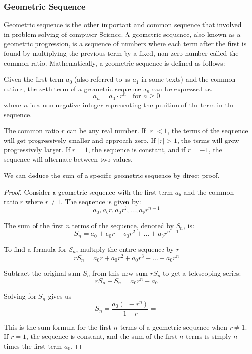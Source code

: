 \subsubsection{Geometric Sequence}
Geometric sequence is the other important and common sequence that involved in problem-solving of computer
Science. 
A geometric sequence, also known as a geometric progression, is a sequence of numbers where each term after 
the first is found by multiplying the previous term by a fixed, non-zero number called the common ratio. 
Mathematically, a geometric sequence is defined as follows:
\begin{definition}
    Given the first term \( a_0 \) (also referred to as \( a_1 \) in some texts) and the common ratio \( r \), the \( n \)-th term of a geometric sequence \( a_n \) can be expressed as:
\[
a_n = a_0 \cdot r^n \quad \text{for } n \geq 0
\]
where \( n \) is a non-negative integer representing the position of the term in the sequence.
\end{definition}    

The common ratio \( r \) can be any real number. If \( |r| < 1 \), the terms of the sequence 
will get progressively smaller and approach zero. If \( |r| > 1 \), the terms will grow progressively 
larger. If \( r = 1 \), the sequence is constant, and if \( r = -1 \), the sequence will alternate 
between two values.

We can deduce the sum of a specific geometric sequence by direct proof.
\begin{theorem}
    
\end{theorem}

\begin{proof}
    Consider a geometric sequence with the first term \( a_0 \) and the common ratio \( r \) where \( r \neq 1 \). The sequence is given by:
\[ a_0, a_0r, a_0r^2, \ldots, a_0r^{n-1} \]

The sum of the first \( n \) terms of the sequence, denoted by \( S_n \), is:
\[ S_n = a_0 + a_0r + a_0r^2 + \ldots + a_0r^{n-1} \]

To find a formula for \( S_n \), multiply the entire sequence by \( r \):
\[ rS_n = a_0r + a_0r^2 + a_0r^3 + \ldots + a_0r^n \]

Subtract the original sum \( S_n \) from this new sum \( rS_n \) to get a telescoping series:
\[ rS_n - S_n = a_0r^n - a_0 \]

Solving for \( S_n \) gives us:
\[ S_n = \frac{a_0(1 - r^n)}{1 - r} = \]

This is the sum formula for the first \( n \) terms of a geometric sequence when \( r \neq 1 \). If \( r = 1 \), the sequence is constant, and the sum of the first \( n \) terms is simply \( n \) times the first term \( a_0 \).
\end{proof}
